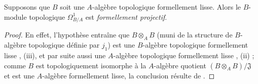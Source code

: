 \begin{theorem}[20.4.9]
\label{0.20.4.9-fr}
Supposons que $B$ soit une $A$-algèbre topologique formellement lisse. Alors
le $B$-module topologique $\Omega^1_{B/A}$ est \emph{formellement projectif}.
\end{theorem}

\begin{proof}
En effet, l'hypothèse entraîne que $B\otimes_A B$ (muni de la structure de
$B$-algèbre topologique définie par $j_1$) est une $B$-algèbre topologique
formellement lisse , (iii), et par suite aussi une
$A$-algèbre topologique formellement lisse , (ii) ; comme
$B$ est topologiquement isomorphe à la $A$-algèbre quotient
$(B\otimes_A B)/\mathfrak{J}$ et est une $A$-algèbre formellement lisse, la
conclusion résulte de .
\end{proof}

